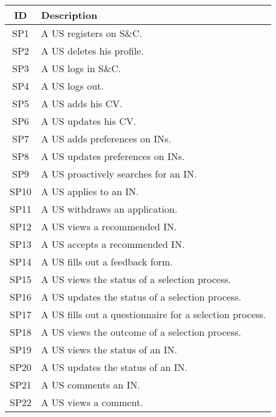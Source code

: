 \begin{longtable}{|c|p{10.5cm}|}
    \hline \rowcolor{polimiblue!40}
    \textbf{ID} & \textbf{Description} \\ \hline
    SP1 & A US registers on S\&C. \\ \hline
    SP2 & A US deletes his profile.\\ \hline
    SP3 & A US logs in S\&C. \\ \hline
    SP4 & A US logs out. \\ \hline
    SP5 & A US adds his CV. \\ \hline
    SP6 & A US updates his CV. \\ \hline
    SP7 & A US adds preferences on INs. \\ \hline
    SP8 & A US updates preferences on INs. \\ \hline
    SP9 & A US proactively searches for an IN. \\ \hline
    SP10 & A US applies to an IN. \\ \hline
    SP11 & A US withdraws an application. \\ \hline
    SP12 & A US views a recommended IN. \\ \hline
    SP13 & A US accepts a recommended IN. \\ \hline
    SP14 & A US fills out a feedback form. \\ \hline
    SP15 & A US views the status of a selection process. \\ \hline
    SP16 & A US updates the status of a selection process. \\ \hline
    SP17 & A US fills out a questionnaire for a selection process. \\ \hline
    SP18 & A US views the outcome of a selection process. \\ \hline
    SP19 & A US views the status of an IN. \\ \hline
    SP20 & A US updates the status of an IN. \\ \hline
    SP21 & A US comments an IN. \\ \hline
    SP22 & A US views a comment. \\ \hline


\end{longtable}

